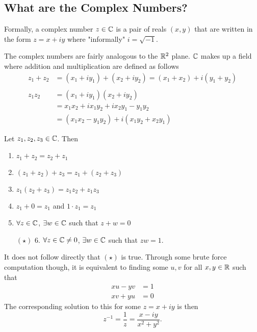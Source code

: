 \documentclass[../notes.tex]{subfiles}
\begin{document}

\subsection{What are the Complex Numbers?}

\begin{definition}
    Formally, a complex number $z \in \mathbb{C}$ is a pair of reals $(x,y)$ that are written in the form $z = x + iy$ where "informally" $i = \sqrt{-1}$.
\end{definition}

The complex numbers are fairly analogous to the $\mathbb{R}^2$ plane. $\mathbb{C}$ makes up a field where addition and multiplication are defined as follows
\begin{align*}
    z_1 + z_2 &= (x_1 + iy_1) + (x_2 + iy_2) = (x_1 + x_2) + i(y_1 + y_2) \\ \\
    z_1 z_2 &= (x_1 + iy_1) (x_2 + iy_2) \\
    &= x_1 x_2 + i x_1 y_2  + i x_2 y_1 - y_1 y_2 \\
    &= (x_1 x_2 - y_1 y_2) + i(x_1 y_2 + x_2 y_1)
\end{align*}

\begin{theorem}
    Let $z_1, z_2, z_3 \in \mathbb{C}$. Then
    \begin{enumerate}[leftmargin=1.3cm]
        \item $z_1 + z_2 = z_2 + z_1$
        \item $(z_1 + z_2) + z_3 = z_1 + (z_2 + z_3)$
        \item $z_1(z_2 + z_3) = z_1 z_2 + z_1 z_3$
        \item $z_1 + 0 = z_1$ and $1 \cdot z_1 = z_1$
        \item $\forall z \in \mathbb{C}$, $\exists w \in \mathbb{C}$ such that $z + w = 0$
        \item[$(\star)$ 6.] $\forall z \in \mathbb{C} \neq 0$, $\exists w \in \mathbb{C}$ such that $zw = 1$.
    \end{enumerate}
\end{theorem}

It does not follow directly that $(\star)$ is true. Through some brute force computation though, it is equivalent to finding some $u,v$ for all $x,y \in \mathbb{R}$ such that
\begin{align*}
    xu - yv &= 1 \\
    xv + yu &= 0
\end{align*}
The corresponding solution to this for some $z = x + iy$ is then
\[
    z^{-1} = \frac{1}{z} = \frac{x - iy}{x^2 + y^2}
.\]
\end{document}
